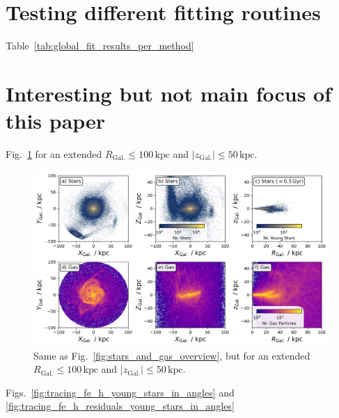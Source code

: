 \documentclass[fleqn,usenatbib]{mnras}
\begin{document}

\clearpage
\appendix

\section{Testing different fitting routines} \label{sec:appendix_different_fits}

Table~\ref{tab:global_fit_results_per_method}



\section{Interesting but not main focus of this paper}

Fig.~\ref{fig:stars_and_gas_overview_100kpc} for an extended $R_\mathrm{Gal.} \leq 100\,\mathrm{kpc}$ and $\vert z_\mathrm{Gal.} \vert \leq 50\,\mathrm{kpc}$.

\begin{figure}
    \centering
    \includegraphics[width=\textwidth]{figures/stars_and_gas_overview_100kpc.png}
    \caption{Same as Fig.~\ref{fig:stars_and_gas_overview}, but for an extended $R_\mathrm{Gal.} \leq 100\,\mathrm{kpc}$ and $\vert z_\mathrm{Gal.} \vert \leq 50\,\mathrm{kpc}$.}
    \label{fig:stars_and_gas_overview_100kpc}
\end{figure}

Figs.~\ref{fig:tracing_fe_h_young_stars_in_angles} and \ref{fig:tracing_fe_h_residuals_young_stars_in_angles}
\end{document}
